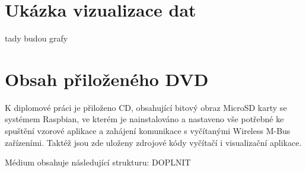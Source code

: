 \chapter{Ukázka vizualizace dat}
\label{PrilohaGrafy}
	\colorbox[rgb]{1,0,0}{tady budou grafy}

\chapter{Obsah přiloženého DVD}
\label{PrilohaMedium}
K diplomové práci je přiloženo CD, obsahující bitový obraz MicroSD karty se systémem Raspbian, ve kterém je nainstalováno a nastaveno vše potřebné ke spuštění vzorové aplikace a zahájení komunikace s vyčítanými Wireless M-Bus zařízeními. Taktéž jsou zde uloženy zdrojové kódy vyčítačí i visualizační aplikace.

Médium obsahuje následující strukturu: \colorbox[rgb]{1,0,0}{DOPLNIT}

